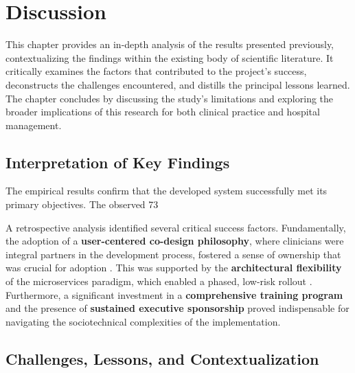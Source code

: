 \chapter{Discussion}

This chapter provides an in-depth analysis of the results presented previously, contextualizing the findings within the existing body of scientific literature. It critically examines the factors that contributed to the project's success, deconstructs the challenges encountered, and distills the principal lessons learned. The chapter concludes by discussing the study's limitations and exploring the broader implications of this research for both clinical practice and hospital management.

\section{Interpretation of Key Findings}

The empirical results confirm that the developed system successfully met its primary objectives. The observed 73%

A retrospective analysis identified several critical success factors. Fundamentally, the adoption of a \textbf{user-centered co-design philosophy}, where clinicians were integral partners in the development process, fostered a sense of ownership that was crucial for adoption \cite{venkatesh2003}. This was supported by the \textbf{architectural flexibility} of the microservices paradigm, which enabled a phased, low-risk rollout \cite{newman2021}. Furthermore, a significant investment in a \textbf{comprehensive training program} and the presence of \textbf{sustained executive sponsorship} proved indispensable for navigating the sociotechnical complexities of the implementation.

\section{Challenges, Lessons, and Contextualization}

